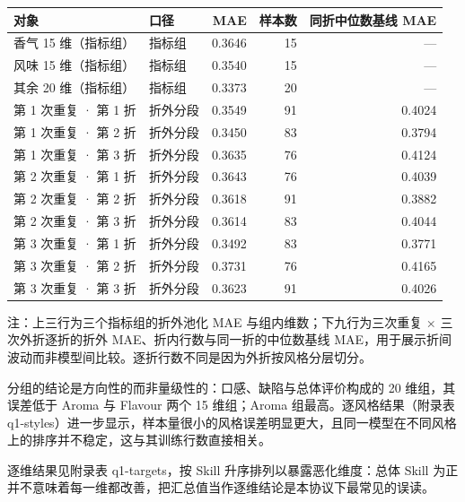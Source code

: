 \documentclass[11pt,a4paper]{article}
\newenvironment{bptable}{%
  \par\medskip\noindent\begin{minipage}{\linewidth}\centering
}{%
  \end{minipage}\par\medskip
}
\newenvironment{tablenote}{%
  \par\smallskip\noindent\footnotesize
  \setlength{\parindent}{0pt}\setlength{\parskip}{0pt}%
  \raggedright
}{%
  \par\medskip
}
\begin{document}
\begin{bptable}
\setcounter{table}{1}
\label{tab:q1-groups}
\par\smallskip
\small
\begin{tabular}{@{}llrrr@{}}
\toprule
对象 & 口径 & MAE & 样本数 & 同折中位数基线 MAE \\
\midrule
香气 15 维（指标组） & 指标组 & 0.3646 & 15 & — \\
风味 15 维（指标组） & 指标组 & 0.3540 & 15 & — \\
其余 20 维（指标组） & 指标组 & 0.3373 & 20 & — \\
第 1 次重复 ·\allowbreak{} 第 1 折 & 折外分段 & 0.3549 & 91 & 0.4024 \\
第 1 次重复 ·\allowbreak{} 第 2 折 & 折外分段 & 0.3450 & 83 & 0.3794 \\
第 1 次重复 ·\allowbreak{} 第 3 折 & 折外分段 & 0.3635 & 76 & 0.4124 \\
第 2 次重复 ·\allowbreak{} 第 1 折 & 折外分段 & 0.3643 & 76 & 0.4039 \\
第 2 次重复 ·\allowbreak{} 第 2 折 & 折外分段 & 0.3618 & 91 & 0.3882 \\
第 2 次重复 ·\allowbreak{} 第 3 折 & 折外分段 & 0.3614 & 83 & 0.4044 \\
第 3 次重复 ·\allowbreak{} 第 1 折 & 折外分段 & 0.3492 & 83 & 0.3771 \\
第 3 次重复 ·\allowbreak{} 第 2 折 & 折外分段 & 0.3731 & 76 & 0.4165 \\
第 3 次重复 ·\allowbreak{} 第 3 折 & 折外分段 & 0.3623 & 91 & 0.4026 \\
\bottomrule
\end{tabular}
\begin{tablenote}注：上三行为三个指标组的折外池化 MAE 与组内维数；下九行为三次重复 × 三次外折逐折的折外 MAE、折内行数与同一折的中位数基线 MAE，用于展示折间波动而非模型间比较。逐折行数不同是因为外折按风格分层切分。\end{tablenote}
\end{bptable}

分组的结论是方向性的而非量级性的：口感、缺陷与总体评价构成的 20
维组，其误差低于 Aroma 与 Flavour 两个 15 维组；Aroma
组最高。逐风格结果（附录表
q1-styles）进一步显示，样本量很小的风格误差明显更大，且同一模型在不同风格上的排序并不稳定，这与其训练行数直接相关。

逐维结果见附录表 q1-targets，按 Skill 升序排列以暴露恶化维度：总体 Skill
为正并不意味着每一维都改善，把汇总值当作逐维结论是本协议下最常见的误读。
\end{document}
